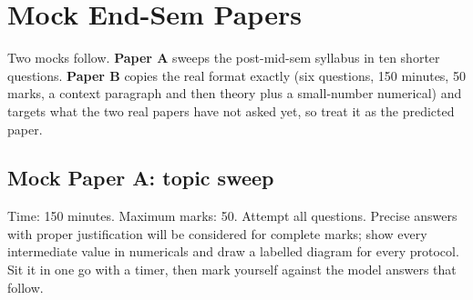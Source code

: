 \clearpage
\section{Mock End-Sem Papers}\label{q:mock}

Two mocks follow. \textbf{Paper A} sweeps the post-mid-sem syllabus in ten shorter questions. \textbf{Paper B} copies the real format exactly (six questions, 150 minutes, 50 marks, a context paragraph and then theory plus a small-number numerical) and targets what the two real papers have not asked yet, so treat it as the predicted paper.

\subsection{Mock Paper A: topic sweep}

\begin{keybox}[title=Instructions]
Time: 150 minutes. Maximum marks: 50. Attempt all questions. Precise answers with proper justification will be considered for complete marks; show every intermediate value in numericals and draw a labelled diagram for every protocol. Sit it in one go with a timer, then mark yourself against the model answers that follow.
\end{keybox}

